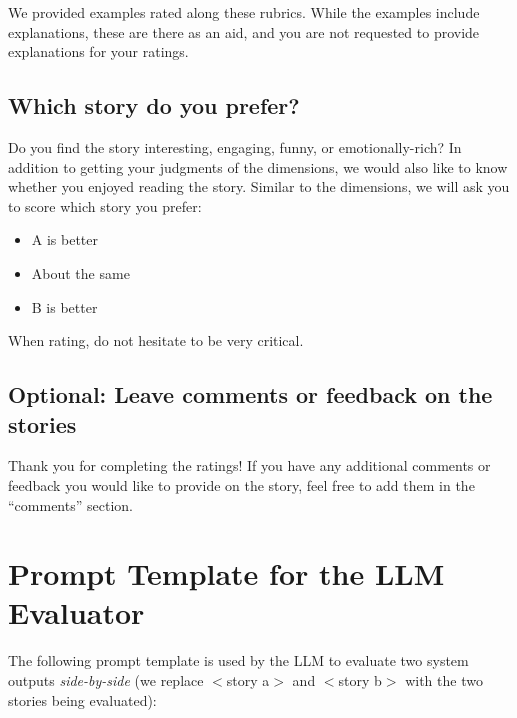 \documentclass{article}
\begin{document}
 
\medskip

We provided examples rated along these rubrics. While the examples include explanations, these are there as an aid, and you are not requested to provide explanations for your ratings. 

\subsection{Which story do you prefer?}
Do you find the story interesting, engaging, funny, or emotionally-rich? In addition to getting your judgments of the dimensions, we would also like to know whether you enjoyed reading the story. Similar to the dimensions, we will ask you to score which story you prefer: \begin{itemize}
\item A is better
\item About the same
\item B is better
\end{itemize}

When rating, do not hesitate to be very critical.

\subsection{Optional: Leave comments or feedback on the stories}
Thank you for completing the ratings! If you have any additional comments or feedback you would like to provide on the story, feel free to add them in the “comments” section.


\section{Prompt Template for the LLM Evaluator}
\label{appendix:sxs_template}

The following prompt template is used by the LLM to evaluate two system outputs \textit{side-by-side}  (we replace $<$story a$>$ and $<$story b$>$ with the two stories being evaluated):
\end{document}
